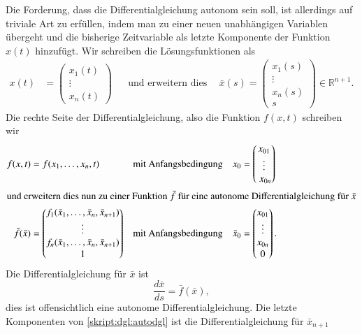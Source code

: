 Die Forderung, dass die Differentialgleichung autonom sein soll, ist
allerdings auf triviale Art zu erfüllen, indem man zu einer neuen
unabhängigen Variablen übergeht und die bisherige Zeitvariable 
als letzte Komponente der Funktion $x(t)$ hinzufügt.
Wir schreiben die Lösungsfunktionen als
\begin{align*}
x(t)
&=
\begin{pmatrix}
x_1(t) \\ \vdots \\x_n(t)
\end{pmatrix}
&&\text{und erweitern dies zu}&
\bar x(s)
=
\begin{pmatrix}
x_1(s) \\ \vdots \\ x_n(s) \\ s
\end{pmatrix}
\in\mathbb R^{n+1}.
\end{align*}
Die rechte Seite der Differentialgleichung, also die Funktion $f(x,t)$
schreiben wir
\begin{align*}
f(x,t) 
&=
f(x_1,\dots,x_n,t)
&&\text{mit Anfangsbedingung}&
x_0 
&=
\begin{pmatrix} x_{01}\\\vdots \\ x_{0n}\end{pmatrix}
\\
\intertext{und erweitern dies nun zu einer Funktion $\bar f$ für eine
autonome Differentialgleichung für $\bar x$}
\bar f(\bar x)
&=
\begin{pmatrix}
f_1(\bar x_1,\dots,\bar x_n,\bar x_{n+1})\\
\vdots\\
f_n(\bar x_1,\dots,\bar x_n,\bar x_{n+1})\\
1
\end{pmatrix}
&&\text{mit Anfangsbedingung}&
\bar x_0
&=
\begin{pmatrix} x_{01} \\ \vdots \\ x_{0n} \\ 0\end{pmatrix}.
\end{align*}
Die Differentialgleichung für $\bar x$ ist
\begin{equation}
\frac{d\bar x}{ds}
=
\bar f(\bar x),
\label{skript:dgl:autodgl}
\end{equation}
dies ist offensichtlich eine autonome Differentialgleichung.
Die letzte Komponenten von \eqref{skript:dgl:autodgl} ist die
Differentialgleichung für $\bar x_{n+1}$
